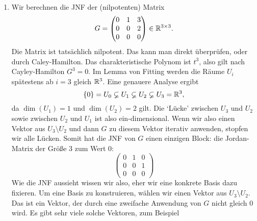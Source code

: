 \begin{bspe}\
	\begin{enumerate}
		\item
		Wir berechnen die JNF der (nilpotenten) Matrix
		\begin{equation*}
			G = \begin{pmatrix}
				0 & 1 & 3 \\
				0 & 0 & 2 \\
				0 & 0 & 0
			\end{pmatrix} \in \mathbb R^{3 \times 3}.
		\end{equation*}
		Die Matrix ist tatsächlich nilpotent. Das kann man direkt überprüfen, oder durch Caley-Hamilton. Das charakteristische Polynom ist $t^3$, also gilt nach Cayley-Hamilton $ G^3 = 0 $. Im Lemma von Fitting werden die Räume $U_i$ spätestens ab $i=3$ gleich $\mathbb R^3$. Eine genauere Analyse ergibt
		\begin{equation*}
			\left\{ 0 \right\} = U_0 \varsubsetneq U_1 \varsubsetneq U_2 \varsubsetneq U_3 = \mathbb R^3,
		\end{equation*}
		da $ \dim(U_1) = 1 $ und $ \dim(U_2) = 2 $ gilt. Die `Lücke' zwischen $U_3$ und $U_2$ sowie zwischen $U_2$ und $U_1$ ist also ein-dimensional. Wenn wir also einen Vektor aus $U_3 \setminus U_2$ und dann $G$ zu diesem Vektor iterativ anwenden, stopfen wir alle Lücken. Somit hat die JNF von $G$ einen einzigen Block: die Jordan-Matrix der Größe $3$ zum Wert $0$:
		\begin{equation*}
			\begin{pmatrix}
				0 & 1 & 0 \\
				0 & 0 & 1 \\
				0 & 0 & 0
			\end{pmatrix}
		\end{equation*}
		Wie die JNF aussieht wissen wir also, eher wir eine konkrete Basis dazu fixieren. 
		Um eine Basis zu konstruieren, wählen wir einen Vektor aus $ U_3 \setminus U_2 $. Das ist ein Vektor, der durch eine zweifache Anwendung von $G$ nicht gleich $0$ wird. Es gibt sehr viele solche Vektoren, zum Beispiel 
		

\end{enumerate}
\end{bspe}
